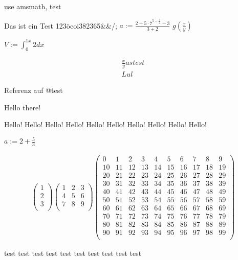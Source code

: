 % 
%
use amsmath, test


\test{}



Das ist ein Test 123öcoi382365&&/;
$a:=\frac{2+{5 \cdot{} 7}^{5-\frac{3}{2}}-3}{3+2}$
$g\left(\frac{x}{y}\right)$

$V := \int_{0}^{1 x}2dx$

\begin{align}
    \frac{x}{y} as test\\
    Lul
\end{align}

Referenz auf @test

Hello there!

Hello!
Hello!
Hello!
Hello!
Hello!
Hello!
Hello!
Hello!
Hello!
Hello!


$a:=2+\frac{5}{3}$

\begin{align}
    \begin{pmatrix}
1\\
2\\
3\\
\end{pmatrix}
\begin{pmatrix}
1 & 2 & 3\\
4 & 5 & 6\\
7 & 8 & 9\\
\end{pmatrix}
\begin{pmatrix}
0 & 1 & 2 & 3 & 4 & 5 & 6 & 7 & 8 & 9\\
10 & 11 & 12 & 13 & 14 & 15 & 16 & 17 & 18 & 19\\
20 & 21 & 22 & 23 & 24 & 25 & 26 & 27 & 28 & 29\\
30 & 31 & 32 & 33 & 34 & 35 & 36 & 37 & 38 & 39\\
40 & 41 & 42 & 43 & 44 & 45 & 46 & 47 & 48 & 49\\
50 & 51 & 52 & 53 & 54 & 55 & 56 & 57 & 58 & 59\\
60 & 61 & 62 & 63 & 64 & 65 & 66 & 67 & 68 & 69\\
70 & 71 & 72 & 73 & 74 & 75 & 76 & 77 & 78 & 79\\
80 & 81 & 82 & 83 & 84 & 85 & 86 & 87 & 88 & 89\\
90 & 91 & 92 & 93 & 94 & 95 & 96 & 97 & 98 & 99\\
\end{pmatrix}

\end{align}





test
test
test
test
test
test
test
test
test
test


%
%
%
%
%
%
%
%
%
%
%